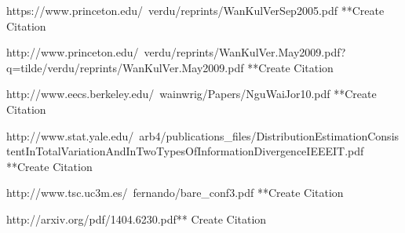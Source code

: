 \documentclass{article}
\begin{document}
	
	\noindent [11] https://www.princeton.edu/~verdu/reprints/WanKulVerSep2005.pdf **Create Citation
	
	\noindent [12]http://www.princeton.edu/~verdu/reprints/WanKulVer.May2009.pdf?q=tilde/verdu/reprints/WanKulVer.May2009.pdf **Create Citation
	
	\noindent [13]http://www.eecs.berkeley.edu/~wainwrig/Papers/NguWaiJor10.pdf **Create Citation
	
	\noindent [14] http://www.stat.yale.edu/~arb4/publications_files/DistributionEstimationConsistentInTotalVariationAndInTwoTypesOfInformationDivergenceIEEEIT.pdf
	**Create Citation
	
	\noindent [15] http://www.tsc.uc3m.es/~fernando/bare_conf3.pdf **Create Citation
	
	\noindent [16] http://arxiv.org/pdf/1404.6230.pdf** Create Citation
\end{document}
